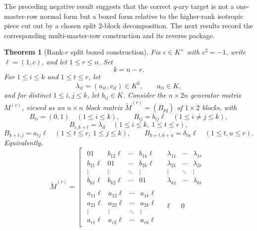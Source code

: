 \documentclass[12pt]{article}
\newtheorem{theorem}{Theorem}[section]
\begin{document}
The preceding negative result suggests that the correct \(q\)-ary target is not a one-master-row normal form but a boxed form relative to the higher-rank isotropic piece cut out by a chosen split \(2\)-block decomposition. The next results record the corresponding multi-master-row construction and its reverse package.

\begin{theorem}[Rank-\texorpdfstring{$r$}{r} split boxed construction]
\label{thm:rank-r-split-boxed}
Fix \(c\in K^\times\) with \(c^2=-1\), write \(\ell=(1,c)\), and let \(1\le r\le n\). Set
\[
k=n-r.
\]
For \(1\le i\le k\) and \(1\le t\le r\), let
\[
\lambda_{it}=(u_{it},v_{it})\in K^2,
\qquad
a_{ti}\in K,
\]
and for distinct \(1\le i,j\le k\), let \(b_{ij}\in K\). Consider the \(n\times 2n\) generator matrix \(M^{(r)}\), viewed as an \(n\times n\) block matrix \(\widetilde M^{(r)}=(B_{pq})\) of \(1\times 2\) blocks, with
\[
B_{ii}=(0,1)\quad (1\le i\le k),\qquad
B_{ij}=b_{ij}\ell\quad (1\le i\neq j\le k),
\]
\[
B_{i,k+t}=\lambda_{it}\quad (1\le i\le k,\ 1\le t\le r),
\]
\[
B_{k+t,j}=a_{tj}\ell\quad (1\le t\le r,\ 1\le j\le k),
\qquad
B_{k+t,k+u}=\delta_{tu}\ell\quad (1\le t,u\le r).
\]
Equivalently,
\[
\widetilde M^{(r)}=
\left[
\begin{array}{c|c}
\begin{array}{cccc}
01 & b_{12}\ell & \cdots & b_{1k}\ell\\
b_{21}\ell & 01 & \cdots & b_{2k}\ell\\
\vdots & \vdots & \ddots & \vdots\\
b_{k1}\ell & b_{k2}\ell & \cdots & 01
\end{array}
&
\begin{array}{ccc}
\lambda_{11} & \cdots & \lambda_{1r}\\
\lambda_{21} & \cdots & \lambda_{2r}\\
\vdots & \ddots & \vdots\\
\lambda_{k1} & \cdots & \lambda_{kr}
\end{array}
\\
\hline
\begin{array}{cccc}
a_{11}\ell & a_{12}\ell & \cdots & a_{1k}\ell\\
a_{21}\ell & a_{22}\ell & \cdots & a_{2k}\ell\\
\vdots & \vdots & \ddots & \vdots\\
a_{r1}\ell & a_{r2}\ell & \cdots & a_{rk}\ell
\end{array}
&
\begin{array}{ccc}
\ell &        & 0\\

\end{array}
\end{array}\]
\end{theorem}
\end{document}
